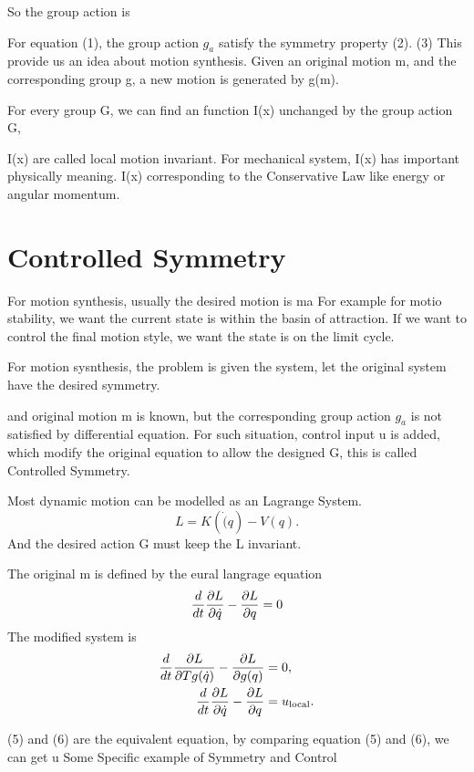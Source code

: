 So the group action is


For equation (1), the group action $g_a$ satisfy the symmetry property (2).
	(3)
This provide us an idea about motion synthesis.
Given an original motion m, and the corresponding group g, a new motion is generated by g(m).

For every group G, we can find an function I(x) unchanged by the group action G, 

I(x) are called local motion invariant. 
For mechanical system,  I(x) has important physically meaning. 
I(x) corresponding to the Conservative Law like energy or angular momentum.
\section{Controlled Symmetry}

For motion synthesis, usually the desired motion is ma
For example for motio stability, we want the current state is within the basin of attraction.
If we want to control the final motion style, we want the state is on the limit cycle.

For motion sysnthesis, the problem is given the system, let the original system have the desired symmetry.

 and original motion m is  known, but the corresponding group action $g_a$ is not satisfied by differential equation.
For such situation, control input u  is added, which modify the original equation to allow the designed G, this is called Controlled Symmetry.

Most dynamic motion can be modelled as an Lagrange System. 
\[
L=K(\dot(q)-V(q).
\]
And the desired action G must keep the L invariant. 

The original m is defined by the eural langrage equation
\begin{equation}
\frac{d}{dt} \frac{\partial L}{\partial \dot{q}} - \frac{\partial L}{\partial q} = 0
\label{eq:uncontrolled_euler_lagrange}
\end{equation}
The modified system is 
\begin{align}
\frac{d}{dt} \frac{\partial L}{\partial Tg(\dot{q})} - \frac{\partial L}{\partial g(q)}&=0,\label{eq:liegroup_euler_lagrange}\\
\frac{d}{dt} \frac{\partial L}{\partial \dot{q}} - \frac{\partial L}{\partial q}&=u_{\mathrm{local}}. \label{eq:controlled_euler_lagrange}
\end{align}


(5) and (6) are the equivalent equation, by comparing  equation (5) and (6), we can get u
Some Specific example of Symmetry and Control
